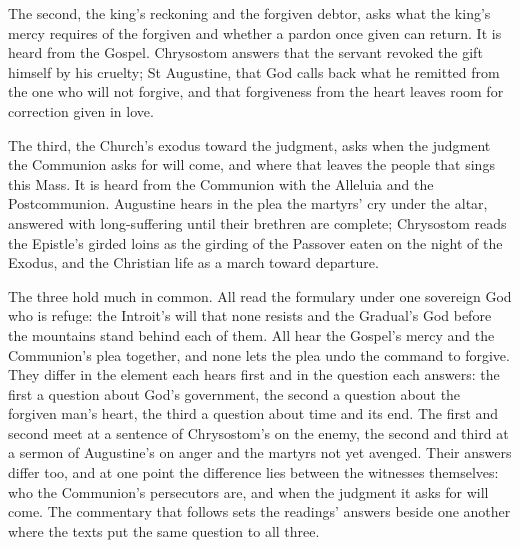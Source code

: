 The second, the
king's reckoning and the forgiven debtor, asks what the king's mercy requires of
the forgiven and whether a pardon once given can return. It is heard from the
Gospel. Chrysostom answers that the servant revoked the gift himself by his
cruelty; St Augustine, that God calls back what he remitted from the one who
will not forgive, and that forgiveness from the heart leaves room for correction
given in love.

The third, the Church's exodus toward the judgment, asks when the
judgment the Communion asks for will come, and where that leaves the people
that sings this Mass. It is heard from the Communion with the Alleluia and the
Postcommunion. Augustine hears in the plea the martyrs' cry under the altar,
answered with long-suffering until their brethren are complete; Chrysostom reads
the Epistle's girded loins as the girding of the Passover eaten on the night of
the Exodus, and the Christian life as a march toward departure.

The three hold much in common. All read the formulary under one sovereign God
who is refuge: the Introit's will that none resists and the Gradual's God before
the mountains stand behind each of them. All hear the Gospel's mercy and the
Communion's plea together, and none lets the plea undo the command to forgive.
They differ in the element each hears first and in the question each answers:
the first a question about God's government, the second a question about the
forgiven man's heart, the third a question about time and its end. The first and
second meet at a sentence of Chrysostom's on the enemy, the second and third at a
sermon of Augustine's on anger and the martyrs not yet avenged. Their answers
differ too, and
at one point the difference lies between the witnesses themselves: who the
Communion's persecutors are, and when the judgment it asks for will come. The
commentary that follows sets the readings' answers beside one another where the
texts put the same question to all three.

